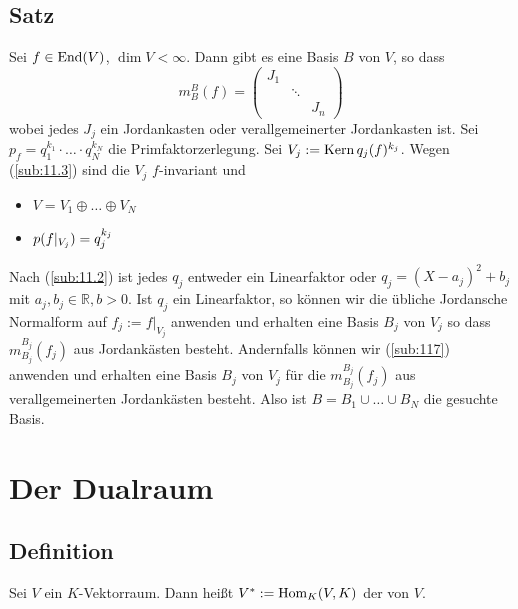 \subsection[Satz: Jordansche Normalform über $\mathds{R}$]{Satz} %
\label{sub:119}
Sei $f \in \operatorname{End}(V)$, $\dim V < \infty$. Dann gibt es eine Basis $B$ von $V$, so dass 
\[
	m_B^B (f) = \begin{pmatrix}
		J_1 & & \\
		& \ddots & \\
		& & J_n
	\end{pmatrix}
\]
wobei jedes $J_j$ ein Jordankasten oder verallgemeinerter Jordankasten ist.
Sei $p_f = q_1^{k_1} \cdot \ldots \cdot q_N^{k_N}$ die Primfaktorzerlegung. Sei $V_j := \operatorname{Kern} q_j(f)^{k_j}$. Wegen (\ref{sub:11.3}) sind die $V_j$ $f$-invariant und
\begin{itemize}
	\item $V= V_1 \oplus \ldots \oplus V_N$
	\item $p(f|_{V_j}) = q_j^{k_j}$
\end{itemize}
Nach (\ref{sub:11.2}) ist jedes $q_j$ entweder ein Linearfaktor oder $q_j = (X-a_j)^2 + b_j$ mit $a_j, b_j \in \mathds{R}, b>0$. Ist $q_j$ ein Linearfaktor, so können wir 
die übliche Jordansche Normalform  auf $f_j := f|_{V_j}$ anwenden und erhalten eine Basis $B_j$ von $V_j$ so dass $m_{B_j}^{B_j}(f_j)$ aus Jordankästen besteht. Andernfalls
können wir (\ref{sub:117}) anwenden und erhalten eine Basis $B_j $ von $V_j$ für die $m_{B_j}^{B_j} (f_j)$ aus verallgemeinerten Jordankästen besteht. Also ist 
$B= B_1 \cup \ldots \cup B_N$ die gesuchte Basis. \bewende

\newpage
\section{Der Dualraum} %
\label{sec:12}

\subsection[Definition: Dualraum]{Definition} %
\label{sub:121}
Sei $V$ ein $K$-Vektorraum. Dann heißt $V^* := \operatorname{Hom}_K (V,K)$ der  von $V$. 

